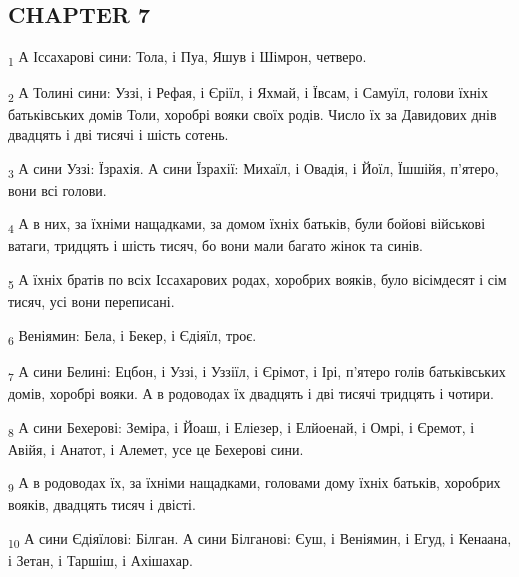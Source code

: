 \subsection{CHAPTER 7}
\begin{tcolorbox}
\textsubscript{1} А Іссахарові сини: Тола, і Пуа, Яшув і Шімрон, четверо.
\end{tcolorbox}
\begin{tcolorbox}
\textsubscript{2} А Толині сини: Уззі, і Рефая, і Єріїл, і Яхмай, і Ївсам, і Самуїл, голови їхніх батьківських домів Толи, хоробрі вояки своїх родів. Число їх за Давидових днів двадцять і дві тисячі і шість сотень.
\end{tcolorbox}
\begin{tcolorbox}
\textsubscript{3} А сини Уззі: Їзрахія. А сини Їзрахії: Михаїл, і Овадія, і Йоїл, Їшшійя, п'ятеро, вони всі голови.
\end{tcolorbox}
\begin{tcolorbox}
\textsubscript{4} А в них, за їхніми нащадками, за домом їхніх батьків, були бойові військові ватаги, тридцять і шість тисяч, бо вони мали багато жінок та синів.
\end{tcolorbox}
\begin{tcolorbox}
\textsubscript{5} А їхніх братів по всіх Іссахарових родах, хоробрих вояків, було вісімдесят і сім тисяч, усі вони переписані.
\end{tcolorbox}
\begin{tcolorbox}
\textsubscript{6} Веніямин: Бела, і Бекер, і Єдіяїл, троє.
\end{tcolorbox}
\begin{tcolorbox}
\textsubscript{7} А сини Белині: Ецбон, і Уззі, і Уззіїл, і Єрімот, і Ірі, п'ятеро голів батьківських домів, хоробрі вояки. А в родоводах їх двадцять і дві тисячі тридцять і чотири.
\end{tcolorbox}
\begin{tcolorbox}
\textsubscript{8} А сини Бехерові: Земіра, і Йоаш, і Еліезер, і Елйоенай, і Омрі, і Єремот, і Авійя, і Анатот, і Алемет, усе це Бехерові сини.
\end{tcolorbox}
\begin{tcolorbox}
\textsubscript{9} А в родоводах їх, за їхніми нащадками, головами дому їхніх батьків, хоробрих вояків, двадцять тисяч і двісті.
\end{tcolorbox}
\begin{tcolorbox}
\textsubscript{10} А сини Єдіяїлові: Білган. А сини Білганові: Єуш, і Веніямин, і Егуд, і Кенаана, і Зетан, і Таршіш, і Ахішахар.
\end{tcolorbox}
